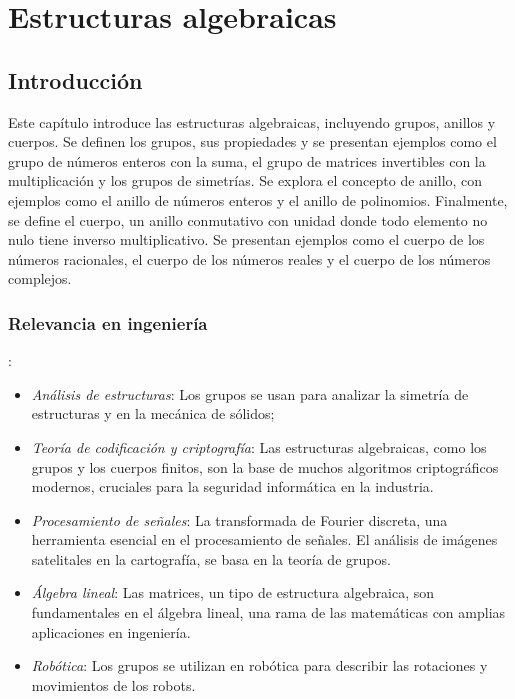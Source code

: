 \chapter{Estructuras algebraicas}


\section{Introducción}

Este capítulo introduce las estructuras algebraicas, incluyendo grupos, anillos y cuerpos. Se definen los grupos, sus propiedades y se presentan ejemplos como el grupo de números enteros con la suma, el grupo de matrices invertibles con la multiplicación y los grupos de simetrías.
Se explora el concepto de anillo, con ejemplos como el anillo de números enteros y el anillo de polinomios. Finalmente, se define el cuerpo, un anillo conmutativo con unidad donde todo elemento no nulo tiene inverso multiplicativo. Se presentan ejemplos como el cuerpo de los números racionales, el cuerpo de los números reales y el cuerpo de los números complejos.

\subsection{Relevancia en ingeniería}:

\begin{itemize}
	\item \textit{Análisis de estructuras}: Los grupos se usan para analizar la simetría de estructuras y en la mecánica de sólidos;
	\item \textit{Teoría de codificación y criptografía}: Las estructuras algebraicas, como los grupos y los cuerpos finitos, son la base de muchos algoritmos criptográficos modernos, cruciales para la seguridad informática en la industria.
	\item \textit{Procesamiento de señales}: La transformada de Fourier discreta, una herramienta esencial en el procesamiento de señales. El análisis de imágenes satelitales en la cartografía, se basa en la teoría de grupos.
	\item \textit{Álgebra lineal}:  Las matrices, un tipo de estructura algebraica, son fundamentales en el álgebra lineal, una rama de las matemáticas con amplias aplicaciones en ingeniería.
	\item \textit{Robótica}: Los grupos se utilizan en robótica para describir las rotaciones y movimientos de los robots.
\end{itemize}

